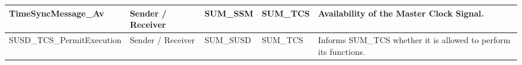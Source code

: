 \begin{longtable}{|l|l|l|l|l|}
\begin{minipage}{0.32\linewidth}\raggedright\vspace{.75ex}TimeSyncMessage\_Av\vspace{.75ex}\end{minipage} & \begin{minipage}{0.11\linewidth}\raggedright\vspace{.75ex}Sender / Receiver\vspace{.75ex}\end{minipage} & \begin{minipage}{0.11\linewidth}\raggedright\vspace{.75ex}SUM\_SSM\vspace{.75ex}\end{minipage} & \begin{minipage}{0.11\linewidth}\raggedright\vspace{.75ex}SUM\_TCS\vspace{.75ex}\end{minipage} & \begin{minipage}{0.21\linewidth}\raggedright\vspace{.75ex}Availability of the Master Clock Signal.\vspace{.75ex}\end{minipage}\\\hline
\begin{minipage}{0.32\linewidth}\raggedright\vspace{.75ex}SUSD\_TCS\_PermitExecution\vspace{.75ex}\end{minipage} & \begin{minipage}{0.11\linewidth}\raggedright\vspace{.75ex}Sender / Receiver\vspace{.75ex}\end{minipage} & \begin{minipage}{0.11\linewidth}\raggedright\vspace{.75ex}SUM\_SUSD\vspace{.75ex}\end{minipage} & \begin{minipage}{0.11\linewidth}\raggedright\vspace{.75ex}SUM\_TCS\vspace{.75ex}\end{minipage} & \begin{minipage}{0.21\linewidth}\raggedright\vspace{.75ex}Informs SUM\_TCS whether it is allowed to perform its functions.\vspace{.75ex}\end{minipage}\\\hline

\end{longtable}
